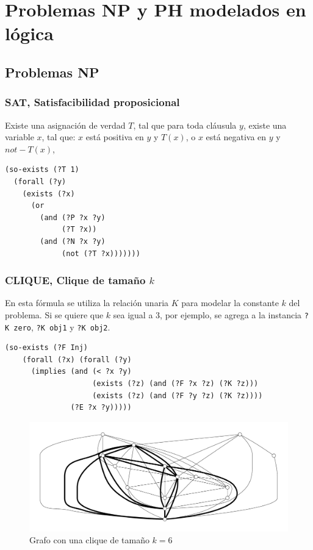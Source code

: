 
\chapter{Problemas NP y PH modelados en lógica}
\label{apendiceA}

\section{Problemas NP}

\subsection{SAT, Satisfacibilidad proposicional}
Existe una asignación de verdad $T$, tal que para toda cláusula $y$, existe una variable $x$, tal que:
$x$ está positiva en $y$ y $T(x)$, o $x$ está negativa en $y$ y $not-T(x)$,
\begin{verbatim}
(so-exists (?T 1)
  (forall (?y)
    (exists (?x)
      (or
        (and (?P ?x ?y)
             (?T ?x)) 
        (and (?N ?x ?y)
             (not (?T ?x)))))))
\end{verbatim}

\subsection{CLIQUE, Clique de tamaño $k$}

En esta fórmula se utiliza la relación unaria $K$ para modelar la constante $k$
del problema. Si se quiere que $k$ sea igual a $3$, por ejemplo, se agrega a la
instancia \texttt{?K zero}, \texttt{?K obj1} y \texttt{?K obj2}.

\begin{verbatim}
(so-exists (?F Inj)
    (forall (?x) (forall (?y)
      (implies (and (< ?x ?y)
                    (exists (?z) (and (?F ?x ?z) (?K ?z)))
                    (exists (?z) (and (?F ?y ?z) (?K ?z))))
               (?E ?x ?y)))))
\end{verbatim}
\begin{figure}[h!]
\centering
\includegraphics[width=\textwidth]{figuras/clique.pdf}
\caption[Grafo con una \textit{clique} de tamaño $k = 6$]{Grafo con una clique de tamaño
$k = 6$}
\label{clique}  
\end{figure}

